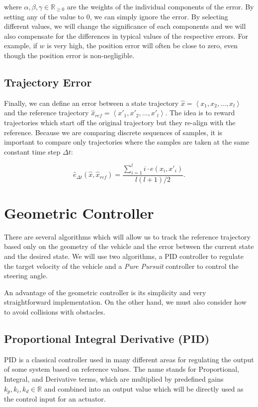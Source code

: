 where $\alpha, \beta, \gamma\in \mathbb{R}_{\geq 0}$ are the weights of the individual components of the error. By setting any of the value to $0$, we can simply ignore the error. By selecting different values, we will change the significance of each components and we will also compensate for the differences in typical values of the respective errors. For example, if $w$ is very high, the position error will often be close to zero, even though the position error is non-negligible.

\subsection{Trajectory Error}

Finally, we can define an error between a state trajectory $\hat{x}=\left\langle x_1, x_2, \ldots, x_l \right\rangle$ and the reference trajectory $\hat{x}_{ref}=\left\langle x'_1, x'_2, \ldots, x'_l \right\rangle$. The idea is to reward trajectories which start off the original trajectory but they re-align with the reference. Because we are comparing discrete sequences of samples, it is important to compare only trajectories where the samples are taken at the same constant time step $\Delta t$:

\[
	\hat{e}_{\Delta t}(\hat{x}, \hat{x}_{ref})=\dfrac{\sum_{i=1}^{l} i\cdot e(x_i, x'_i)}{l(l+1)/2}.
\]

\section{Geometric Controller}

There are several algorithms which will allow us to track the reference trajectory based only on the geometry of the vehicle and the error between the current state and the desired state. We will use two algorithms, a \gls{PID} controller to regulate the target velocity of the vehicle and a \textit{Pure Pursuit} controller to control the steering angle.

An advantage of the geometric controller is its simplicity and very straightforward implementation. On the other hand, we must also consider how to avoid collisions with obstacles.

\subsection{Proportional Integral Derivative (PID)}

\gls*{PID} is a classical controller used in many different areas for regulating the output of some system based on reference values. The name stands for Proportional, Integral, and Derivative terms, which are multiplied by predefined gains $k_p,k_i,k_d\in\mathbb{R}$ and combined into an output value which will be directly used as the control input for an actuator.

